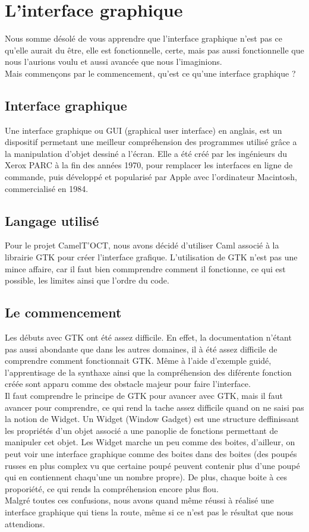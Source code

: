 \section{L'interface graphique}
Nous somme désolé de vous apprendre que l'interface graphique n'est pas ce qu'elle aurait du être, elle est fonctionnelle, certe, mais pas aussi fonctionnelle que nous l'aurions voulu et aussi avancée que nous l'imaginions.\\
Mais commençons par le commencement, qu'est ce qu'une interface graphique ?

	\subsection{Interface graphique}
	Une interface graphique ou GUI (graphical user interface) en anglais, est un dispositif permetant une meilleur compréhension des programmes utilisé grâce a la manipulation d'objet dessiné a l'écran. Elle a été créé par les ingénieurs du Xerox PARC à la fin des années 1970, pour remplacer les interfaces en ligne de commande, puis développé et popularisé par Apple avec l'ordinateur Macintosh, commercialisé en 1984.

	\subsection{Langage utilisé}
		Pour le projet CamelT'OCT, nous avons décidé d'utiliser Caml associé à la librairie GTK pour créer l'interface grafique. L'utilisation de GTK n'est pas une mince affaire, car il faut bien commprendre comment il fonctionne, ce qui est possible, les limites ainsi que l'ordre du code.

	\subsection{Le commencement}
	Les débuts avec GTK ont été assez difficile. En effet, la documentation n'étant pas aussi abondante que dans les autres domaines, il à été assez difficile de comprendre comment fonctionnait GTK. Même à l'aide d'exemple guidé, l'apprentisage de la synthaxe ainsi que la compréhension des diférente fonction créée sont apparu comme des obstacle majeur pour faire l'interface.\\
	Il faut comprendre le principe de GTK pour avancer avec GTK, mais il faut avancer pour comprendre, ce qui rend la tache assez difficile quand on ne saisi pas la notion de Widget. Un Widget (Window Gadget) est une structure deffinissant les propriétés d'un objet associé a une panoplie de fonctions permettant de manipuler cet objet. Les Widget marche un peu comme des boites, d'ailleur, on peut voir une interface graphique comme des boites dans des boites (des poupés russes en plus complex vu que certaine poupé peuvent contenir plus d'une poupé qui en contiennent chaqu'une un nombre propre). De plus, chaque boite à ces proporiété, ce qui rends la compréhension encore plus flou. \\
	Malgré toutes ces confusions, nous avons quand même réussi à réalisé une interface graphique qui tiens la route, même si ce n'est pas le résultat que nous attendions.

